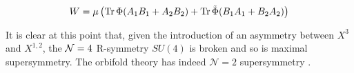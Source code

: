 \begin{equation}
	W = \mu \left( \operatorname{Tr} \Phi (A_1 B_1 + A_2 B_2 ) + \operatorname{Tr} \tilde\Phi (B_1 A_1 + B_2 A_2) \right)
	\label{}
\end{equation}

It is clear at this point that, given the introduction of an asymmetry between $X^3$ and $X^{1,2}$, the $\mathcal{N} = 4$ R-symmetry $SU(4)$ is broken and so is maximal supersymmetry. The orbifold theory has indeed $\mathcal{N}=2$ supersymmetry \cite{Douglas}.

%
%
%
%
%
%
%
%
%

